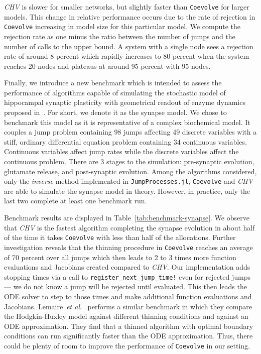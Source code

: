 \documentclass{juliacon}
\numberwithin{equation}{section}
\newcommand{\etal}{\textit{et al}.}
\begin{document}
\textit{CHV} is slower for smaller networks, but slightly faster than \texttt{Coevolve} for larger models. This change in relative performance occurs due to the rate of rejection in \texttt{Coevolve} increasing in model size for this particular model. We compute the rejection rate as one minus the ratio between the number of jumps and the number of calls to the upper bound. A system with a single node sees a rejection rate of around 8 percent which rapidly increases to 80 percent when the system reaches 20 nodes and plateaus at around 95 percent with 95 nodes.

Finally, we introduce a new benchmark which is intended to assess the performance of algorithms capable of simulating the stochastic model of hippocampal synaptic plasticity with geometrical readout of enzyme dynamics proposed in~\cite{rodrigues2021}. For short, we denote it as the synapse model. We chose to benchmark this model as it is representative of a complex biochemical model. It couples a jump problem containing 98 jumps affecting 49 discrete variables with a stiff, ordinary differential equation problem containing 34 continuous variables. Continuous variables affect jump rates while the discrete variables affect the continuous problem. There are 3 stages to the simulation: pre-synaptic evolution, glutamate release, and post-synaptic evolution. Among the algorithms considered, only the \textit{inverse} method implemented in \texttt{JumpProcesses.jl}, \texttt{Coevolve} and \textit{CHV} are able to simulate the synapse model in theory. However, in practice, only the last two complete at least one benchmark run.

Benchmark results are displayed in Table~\ref{tab:benchmark-synapse}. We observe that \textit{CHV} is the fastest algorithm completing the synapse evolution in about half of the time it takes \texttt{Coevolve} with less than half of the allocations. Further investigation reveals that the thinning procedure in \texttt{Coevolve} reaches an average of 70 percent over all jumps which then leads to 2 to 3 times more function evaluations and Jacobians created compared to \textit{CHV}. Our implementation adds stopping times via a call to \texttt{register\_next\_jump\_time!} even for rejected jumps --- we do not know a jump will be rejected until evaluated. This then leads the ODE solver to step to those times and make additional function evaluations and Jacobians. Lemaire~\etal~\cite{lemaire2018} performs a similar benchmark in which they compare the Hodgkin-Huxley model against different thinning conditions and against an ODE approximation. They find that a thinned algorithm with optimal boundary conditions can run significantly faster than the ODE approximation. Thus, there could be plenty of room to improve the performance of \texttt{Coevolve} in our setting.
\end{document}
